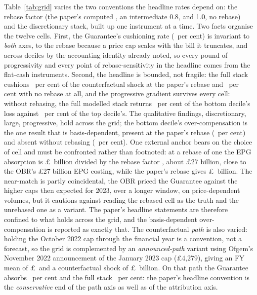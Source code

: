 Table~\ref{tab:grid} varies the two conventions the headline rates
depend on: the rebase factor (the paper's computed \SsRebaseFactor,
an intermediate 0.8, and 1.0, no rebase) and the discretionary stack,
built up one instrument at a time. Two facts organise the twelve
cells. First, the Guarantee's cushioning rate
(\SsGridPaperEpgRatePct\ per cent) is invariant to \emph{both}
axes, to the rebase because a price cap scales with the bill it
truncates, and across deciles by the accounting identity already
noted, so every pound of progressivity and every point of
rebase-sensitivity in the headline comes from the flat-cash
instruments. Second, the headline is bounded, not fragile: the full
stack cushions \SsGridPaperFullRatePct\ per cent of the
counterfactual shock at the paper's rebase and
\SsGridUnityFullRatePct\ per cent with no rebase at all, and the
progressive gradient survives every cell: without rebasing, the full
modelled stack returns \SsGridUnityFullDOne\ per cent of the bottom
decile's loss against \SsGridUnityFullDTen\ per cent of the top
decile's. The qualitative
findings, discretionary, large, progressive, hold across the grid;
the bottom decile's over-compensation is the one result that is
basis-dependent, present at the paper's rebase
(\SsGridPaperFullDOne\ per cent) and absent without rebasing
(\SsGridUnityFullDOne\ per cent). One external anchor bears on the
choice of cell and must be confronted rather than footnoted: at a
rebase of one the EPG absorption is \pounds\SsEpgBn\ billion divided
by the rebase factor \SsRebaseFactor, about \pounds 27 billion,
close to the OBR's \pounds 27 billion EPG costing, while the paper's
rebase gives \pounds\SsEpgBn\ billion. The near-match is partly
coincidental, the OBR priced the Guarantee against the higher caps
then expected for 2023, over a longer window, on price-dependent
volumes, but it cautions against reading the rebased cell as the
truth and the unrebased one as a variant. The paper's headline
statements are therefore confined to what holds across the grid, and
the basis-dependent over-compensation is reported as exactly that.
The counterfactual \emph{path} is also varied: holding the October
2022 cap through the financial year is a convention, not a forecast,
so the grid is complemented by an \emph{announced-path} variant using
Ofgem's November 2022 announcement of the January 2023 cap
(\pounds 4{,}279), giving an FY mean of \pounds\SsAnnCounterFyCap\
and a counterfactual shock of \pounds\SsAnnCounterAggBn\ billion. On
that path the Guarantee absorbs \SsAnnEpgRatePct\ per cent and the
full stack \SsAnnFullRatePct\ per cent: the paper's headline
convention is the \emph{conservative} end of the path axis as well as
of the attribution axis.

